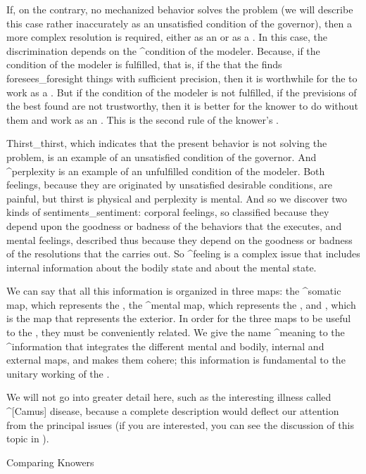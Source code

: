 If, on the contrary, no mechanized behavior solves the problem (we will
describe this case rather inaccurately as an unsatisfied condition of
the governor), then a more complex resolution is required, either as an
{\adaptor} or as a {\learner}. In this case, the discrimination depends
on the ^{condition of the modeler}. Because, if the condition of the
modeler is fulfilled, that is, if the {\reality} that the {\modeler}
finds foresees_{foresight} things with sufficient precision, then it is
worthwhile for the {\knower} to work as a {\learner}. But if the
condition of the modeler is not fulfilled, if the previsions of the best
{\reality} found are not trustworthy, then it is better for the knower
to do without them and work as an {\adaptor}. This is the second rule of
the knower's {\intelligence}.

Thirst_{thirst}, which indicates that the present behavior is not
solving the problem, is an example of an unsatisfied condition of the
governor. And ^{perplexity} is an example of an unfulfilled condition of
the modeler. Both feelings, because they are originated by unsatisfied
desirable conditions, are painful, but thirst is physical and perplexity
is mental. And so we discover two kinds of sentiments_{sentiment}:
corporal feelings, so classified because they depend upon the goodness
or badness of the behaviors that the {\body} executes, and mental
feelings, described thus because they depend on the goodness or badness
of the resolutions that the {\mind} carries out. So ^{feeling} is a
complex issue that includes internal information about the bodily state
and about the mental state.

We can say that all this information is organized in three maps: the
^{somatic map}, which represents the {\body}, the ^{mental map}, which
represents the {\mind}, and {\reality}, which is the map that represents
the exterior. In order for the three maps to be useful to the
{\intelligence}, they must be conveniently related. We give the name
^{meaning} to the ^{information} that integrates the different mental
and bodily, internal and external maps, and makes them cohere; this
information is fundamental to the unitary working of the {\knower}.

We will not go into greater detail here, such as the interesting illness
called ^[Camus] disease, because a complete description would deflect
our attention from the principal issues (if you are interested, you can
see the discussion of this topic in ).


\Section Comparing Knowers

